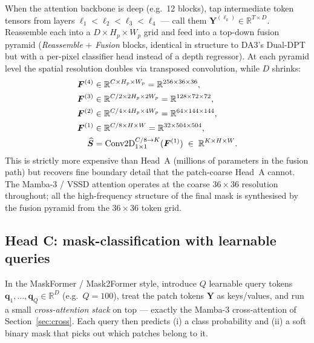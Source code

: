 \documentclass[11pt,a4paper]{article}
\begin{document}
When the attention backbone is deep (e.g.\ 12 blocks), tap
intermediate token tensors from layers
$\ell_1<\ell_2<\ell_3<\ell_4$ — call them
$\bm{Y}^{(\ell_k)}\in\mathbb{R}^{T\times D}$. Reassemble each into a
$D\!\times\!H_p\!\times\!W_p$ grid and feed into a top-down fusion
pyramid (\emph{Reassemble} $+$ \emph{Fusion} blocks, identical in
structure to DA3's Dual-DPT but with a per-pixel classifier head
instead of a depth regressor). At each pyramid level the spatial
resolution doubles via transposed convolution, while $D$ shrinks:
\begin{align}
  \bm{F}^{(4)} &\in\mathbb{R}^{C\times H_p\times W_p}
       = \mathbb{R}^{256\times 36\times 36}, \\
  \bm{F}^{(3)} &\in\mathbb{R}^{C/2\times 2H_p\times 2W_p}
       = \mathbb{R}^{128\times 72\times 72}, \notag \\
  \bm{F}^{(2)} &\in\mathbb{R}^{C/4\times 4H_p\times 4W_p}
       = \mathbb{R}^{64\times 144\times 144}, \\
  \bm{F}^{(1)} &\in\mathbb{R}^{C/8\times H\times W}
       = \mathbb{R}^{32\times 504\times 504}, \notag\\
  \widehat{\bm{S}} &= \mathrm{Conv2D}_{1\times 1}^{C/8\to K}(\bm{F}^{(1)})
       \;\in\;\mathbb{R}^{K\times H\times W}.
\end{align}
This is strictly more expensive than Head~A (millions of parameters
in the fusion path) but recovers fine boundary detail that the
patch-coarse Head~A cannot. The Mamba-3 / VSSD attention operates at
the coarse $36\!\times\!36$ resolution throughout; all the high-frequency
structure of the final mask is synthesised by the fusion pyramid from
the $36\!\times\!36$ token grid.

\subsection{Head C: mask-classification with learnable queries}
\label{sec:seg-C}

In the MaskFormer / Mask2Former style, introduce $Q$ learnable query
tokens $\bm{q}_1,\dots,\bm{q}_Q\in\mathbb{R}^{D}$ (e.g.\ $Q\!=\!100$),
treat the patch tokens $\bm{Y}$ as keys/values, and run a small
\emph{cross-attention stack} on top — exactly the Mamba-3
cross-attention of Section~\ref{sec:cross}. Each query then predicts
(i) a class probability and (ii) a soft binary mask that picks out
which patches belong to it.
\end{document}
